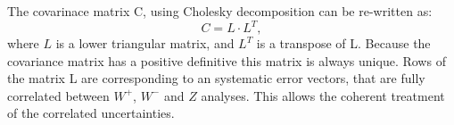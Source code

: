 The covarinace matrix C, using Cholesky decomposition\cite{Dickinson1978} can be re-written as:
\begin{equation}
C=L \cdot L^{T},
\end{equation}
where $L$ is a lower triangular matrix, and $L^{T}$ is a transpose of L. Because the covariance matrix has a positive definitive this matrix is always unique. 
Rows of the matrix L are corresponding to an systematic error vectors, that are fully correlated between $W^{+}$, $W^{-}$ and $Z$ analyses. This allows the coherent treatment of the correlated uncertainties.



